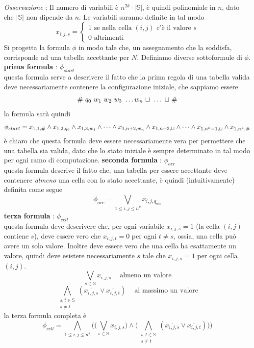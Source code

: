 \documentclass[10pt, letterpaper]{report}
\begin{document}
\textit{Osservazione} : Il numero di variabili è $n^{2k}\cdot |\mathbb{S}|$, è quindi polinomiale in $n$, dato che $|\mathbb{S}|$ non dipende da $n$.\acc 
Le variabili saranno definite in tal modo $$x_{i,j,s}=\begin{cases}
    1 \text{ se nella cella $(i,j)$ c'è il valore }s \\ 
    0 \text{ altrimenti }
\end{cases} $$
Si progetta la formula $\phi$ in modo tale che, un assegnamento che la soddisfa, corrisponde ad una tabella accettante per $N$. Definiamo diverse sottoformule di $\phi$.\acc 
\textbf{prima formula} : $\phi_{start}$\\
questa formula serve a descrivere il fatto che la prima regola di una tabella valida deve necessariamente contenere la configurazione iniziale, che sappiamo essere 
$$ \# \  q_0 \ w_1 \ w_2 \ w_3 \ \dots w_n \ \blank \ \dots \ \blank \ \#$$
la formula sarà quindi 
$$ 
\phi_{start}=x_{1,1,\#}\land x_{1,2,q_0}\land x_{1,3,w_1} \land \dots \land  
x_{1,n+2,w_n}\land x_{1,n+3,{\sqcup} }\land \dots \land  
x_{1,n^k-1,{\sqcup} }\land x_{1,n^k,\#}
$$
è chiaro che questa formula deve essere necessariamente vera per permettere che una tabella sia valida, dato che lo stato iniziale è sempre determinato in tal modo per ogni ramo di computazione.\acc
\textbf{seconda formula} : $\phi_{acc}$\\ 
questa formula descrive il fatto che, una tabella per essere accettante deve contenere \textit{almeno} una cella con lo stato accettante, è quindi (intuitivamente) definita come segue $$ 
\phi_{acc}=\bigvee_{1 \leq i,j \leq n^k} x_{i,j,q_{acc}}$$
\textbf{terza formula} : $\phi_{cell}$\\
questa formula deve descrivere che, per ogni variabile $x_{i,j,s}=1$ (la cella $(i,j)$ contiene $s$), deve essere vero che $x_{i,j,t}=0$ per ogni $t\ne s$, ossia, una cella può avere un solo valore. Inoltre deve essere vero che una cella ha esattamente un valore, quindi deve esistere necessariamente $s$ tale che $x_{i,j,s}=1$ per ogni cella $(i,j)$. 
$$\bigvee_{s\in\mathbb S} x_{i,j,s} \ \ \ \   \text{ almeno un valore}$$
$$ \bigwedge\limits_{\begin{matrix}s,t\in\mathbb{S}\\ s\ne t\end{matrix}}
(\overline{x_{i,j,s}}\lor \overline{x_{i,j,t}})\ \ \ \   \text{ al massimo un valore}$$
la terza formula completa è 
$$ \phi_{cell}=\bigwedge\limits_{1 \leq i,j \leq n^k} \Big(
    \Big(\bigvee_{s\in\mathbb S} x_{i,j,s}\Big) \land
    \Big(\bigwedge\limits_{\begin{matrix}s,t\in\mathbb{S}\\ s\ne t\end{matrix}}
    (\overline{x_{i,j,s}}\lor \overline{x_{i,j,t}})\Big) 
\Big)$$
\end{document}
